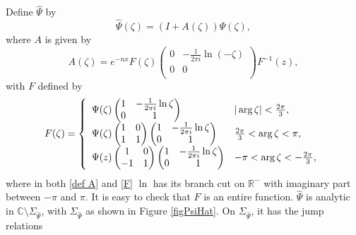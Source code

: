\documentclass[11pt,fleqn]{article}
\numberwithin{equation}{section}
\begin{document}
Define $\widehat{\Psi}$ by
\begin{equation}\label{def hatPsi}
\widehat{\Psi}(\zeta) = \left( I + A(\zeta) \right) \Psi(\zeta), 
\end{equation}
where $A$ is given by 
\begin{equation}\label{def A}
A(\zeta) = e^{-nx} F(\zeta) \begin{pmatrix}
0 & - \frac{1}{2\pi i} \ln(-\zeta) \\ 0 & 0 \\
\end{pmatrix} F^{-1}(z),
\end{equation}
with $F$ defined by
\begin{equation}\label{F}
F(\zeta) = \left\{ \begin{array}{l l}
\Psi(\zeta) \begin{pmatrix}
1 & -\frac{1}{2\pi i} \ln \zeta \\
0 & 1
\end{pmatrix} & | \arg \zeta | < \frac{2\pi}{3}, \\

\Psi(\zeta) \begin{pmatrix}
1 & 0 \\
1 & 1
\end{pmatrix} \begin{pmatrix}
1 & -\frac{1}{2\pi i} \ln \zeta \\
0 & 1
\end{pmatrix} & \frac{2\pi}{3} < \arg \zeta < \pi, \\

\Psi(z) \begin{pmatrix}
1 & 0 \\
-1 & 1
\end{pmatrix} \begin{pmatrix}
1 & -\frac{1}{2\pi i} \ln \zeta \\
0 & 1
\end{pmatrix} & -\pi < \arg \zeta < -\frac{2\pi}{3}, \\

\end{array} \right. 
\end{equation}
where in both \eqref{def A} and \eqref{F} $\ln$ has its branch cut on $\mathbb{R}^{-}$ with imaginary part between $-\pi$ and $\pi$. It is easy to check that $F$ is an entire function.
$\widehat{\Psi}$ is analytic in  $\mathbb{C} \setminus \Sigma_{\widehat{\Psi}}$, with $\Sigma_{\widehat{\Psi}}$ as shown in Figure \ref{figPsiHat}. On $\Sigma_{\widehat{\Psi}}$, it has the jump relations
\end{document}
